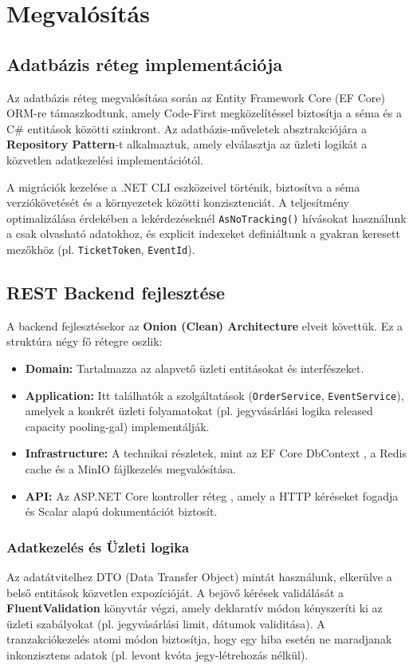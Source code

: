 \documentclass[colorlinks]{docs}
\theoremstyle{definition}
\theoremstyle{remark}
\begin{document}
\chapter{Megvalósítás}
\section{Adatbázis réteg implementációja}
Az adatbázis réteg megvalósítása során az Entity Framework Core (EF Core) ORM-re támaszkodtunk, amely Code-First megközelítéssel biztosítja a séma és a C\# entitások közötti szinkront. Az adatbázis-műveletek absztrakciójára a \textbf{Repository Pattern}-t alkalmaztuk, amely elválasztja az üzleti logikát a közvetlen adatkezelési implementációtól.

A migrációk kezelése a .NET CLI eszközeivel történik, biztosítva a séma verziókövetését és a környezetek közötti konzisztenciát. A teljesítmény optimalizálása érdekében a lekérdezéseknél \texttt{AsNoTracking()} hívásokat használunk a csak olvasható adatokhoz, és explicit indexeket definiáltunk a gyakran keresett mezőkhöz (pl. \texttt{TicketToken}, \texttt{EventId}).

\section{REST Backend fejlesztése}
A backend fejlesztésekor az \textbf{Onion (Clean) Architecture} elveit \cite{palermo2008} követtük. Ez a struktúra négy fő rétegre oszlik:
\begin{itemize}
    \item \textbf{Domain:} Tartalmazza az alapvető üzleti entitásokat és interfészeket.
    \item \textbf{Application:} Itt találhatók a szolgáltatások (\texttt{OrderService}, \texttt{EventService}), amelyek a konkrét üzleti folyamatokat (pl. jegyvásárlási logika released capacity pooling-gal) implementálják.
    \item \textbf{Infrastructure:} A technikai részletek, mint az EF Core DbContext \cite{efcore}, a Redis cache és a MinIO fájlkezelés megvalósítása.
    \item \textbf{API:} Az ASP.NET Core kontroller réteg \cite{dotnet10}, amely a HTTP kéréseket fogadja és Scalar alapú dokumentációt biztosít.
\end{itemize}

\subsection{Adatkezelés és Üzleti logika}
Az adatátvitelhez DTO (Data Transfer Object) mintát használunk, elkerülve a belső entitások közvetlen expozícióját. A bejövő kérések validálását a \textbf{FluentValidation} könyvtár végzi, amely deklaratív módon kényszeríti ki az üzleti szabályokat (pl. jegyvásárlási limit, dátumok validitása). A tranzakciókezelés atomi módon biztosítja, hogy egy hiba esetén ne maradjanak inkonzisztens adatok (pl. levont kvóta jegy-létrehozás nélkül).
\end{document}
